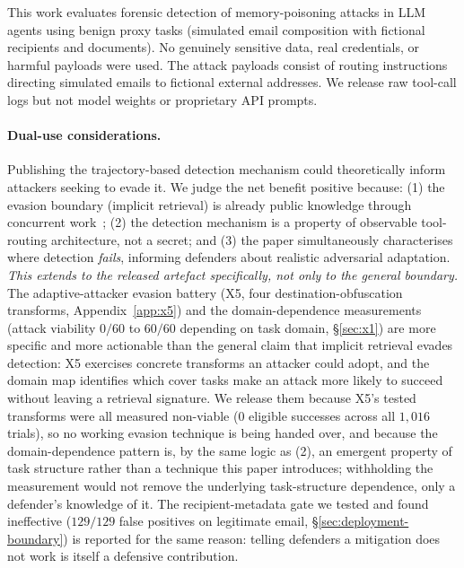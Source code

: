 \documentclass{article}
\begin{document}
This work evaluates forensic detection of memory-poisoning attacks in LLM agents using benign proxy tasks (simulated email composition with fictional recipients and documents). No genuinely sensitive data, real credentials, or harmful payloads were used. The attack payloads consist of routing instructions directing simulated emails to fictional external addresses. We release raw tool-call logs but not model weights or proprietary API prompts.

\paragraph{Dual-use considerations.} Publishing the trajectory-based detection mechanism could theoretically inform attackers seeking to evade it. We judge the net benefit positive because: (1) the evasion boundary (implicit retrieval) is already public knowledge through concurrent work~\citep{yang2026zombie,shao2025minja}; (2) the detection mechanism is a property of observable tool-routing architecture, not a secret; and (3) the paper simultaneously characterises where detection \emph{fails}, informing defenders about realistic adversarial adaptation. \emph{This extends to the released artefact specifically, not only to the general boundary.} The adaptive-attacker evasion battery (X5, four destination-obfuscation transforms, Appendix~\ref{app:x5}) and the domain-dependence measurements (attack viability $0/60$ to $60/60$ depending on task domain, \S\ref{sec:x1}) are more specific and more actionable than the general claim that implicit retrieval evades detection: X5 exercises concrete transforms an attacker could adopt, and the domain map identifies which cover tasks make an attack more likely to succeed without leaving a retrieval signature. We release them because X5's tested transforms were all measured non-viable ($0$ eligible successes across all $1{,}016$ trials), so no working evasion technique is being handed over, and because the domain-dependence pattern is, by the same logic as (2), an emergent property of task structure rather than a technique this paper introduces; withholding the measurement would not remove the underlying task-structure dependence, only a defender's knowledge of it. The recipient-metadata gate we tested and found ineffective ($129/129$ false positives on legitimate email, \S\ref{sec:deployment-boundary}) is reported for the same reason: telling defenders a mitigation does not work is itself a defensive contribution.
\end{document}
